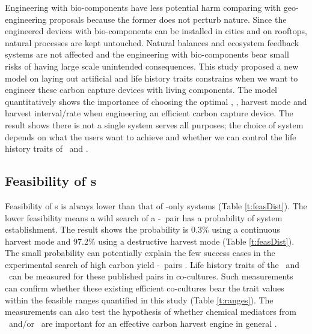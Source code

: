 \documentclass[../thesis.tex]{subfiles} %
\begin{document}
Engineering with bio-components have less potential harm comparing with geo-engineering proposals because the former does not perturb nature.  Since the engineered devices with bio-components can be installed in cities and on rooftops, natural processes are kept untouched.  Natural balances and ecosystem feedback systems are not affected and the engineering with bio-components bear small risks of having large scale unintended consequences.  This study proposed a new model on laying out artificial and life history traits constrains when we want to engineer these carbon capture devices with living components.  The model quantitatively shows the importance of choosing the optimal \phy, \bac, harvest mode and harvest interval/rate when engineering an efficient carbon capture device.  The result shows there is not a single system serves all purposes; the choice of system depends on what the users want to achieve and whether we can control the life history traits of \phy\ and \bac.

\subsection{Feasibility of \pbs s}
Feasibility of \pbs s is always lower than that of \phy-only systems (Table \ref{t:feasDist}).  The lower feasibility means a wild search of a \phy-\bac\ pair has a probability of system establishment.  The result shows the probability is 0.3\% using a continuous harvest mode and 97.2\% using a destructive harvest mode (Table \ref{t:feasDist}).  The small probability can potentially explain the few success cases in the experimental search of high carbon yield \phy-\bac\ pairs \autocite{fuentes2016impact}.  Life history traits of the \phy\ and \bac\ can be measured for these published pairs in co-cultures.  Such measurements can confirm whether these existing efficient co-cultures bear the trait values within the feasible ranges quantified in this study (Table \ref{t:ranges}).  The measurements can also test the hypothesis of whether chemical mediators from \phy\ and/or \bac\ are important for an effective carbon harvest engine in general \autocite{rivas2010interactions,amin2009photolysis,fuentes2016impact}.
\end{document}
